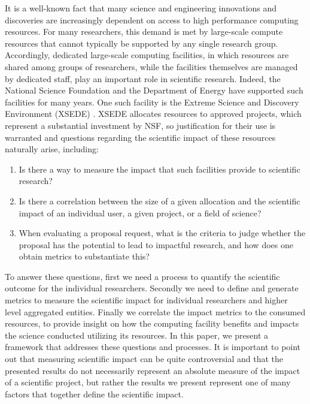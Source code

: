 \documentclass{sig-alternate}
\begin{document}
It is a well-known fact that many science and engineering innovations and discoveries are increasingly dependent on access to high performance computing resources. For many researchers, this demand is met by large-scale compute resources that cannot typically be supported by any single research group. Accordingly, dedicated large-scale computing facilities, in which resources are shared among groups of researchers, while the facilities themselves are managed by dedicated staff, play an important role in scientific research. Indeed, the National Science Foundation and the Department of Energy have supported such facilities for many years. One such facility is the Extreme Science and Discovery Environment (XSEDE) \cite{www-xsede}. XSEDE allocates resources to approved projects, which represent a substantial investment by NSF, so justification for their use is warranted and questions regarding the scientific impact of these resources naturally arise, including:

\begin{enumerate}
\item Is there a way to measure the impact that such facilities provide to scientific research?
\item Is there a correlation between the size of a given allocation and the scientific impact of an individual user, a given project, or a field of science?   
\item When evaluating a proposal request, what is the criteria to judge whether the proposal has the potential to lead to impactful research, and how does one obtain metrics to substantiate this? 
\end{enumerate} 

To answer these questions, first we need a process to quantify the scientific outcome for the individual researchers. Secondly we need to define and generate metrics to measure the scientific impact for individual researchers and higher level aggregated entities. Finally we correlate the impact metrics to the consumed resources, to provide insight on how the computing facility benefits and impacts the science conducted utilizing its resources. In this paper, we present a framework that addresses these questions and processes. It is important to point out that measuring scientific impact can be quite controversial and that the presented results do not necessarily represent an absolute measure of the impact of a scientific project, but rather the results we present represent one of many factors that together define the scientific impact.
\end{document}
